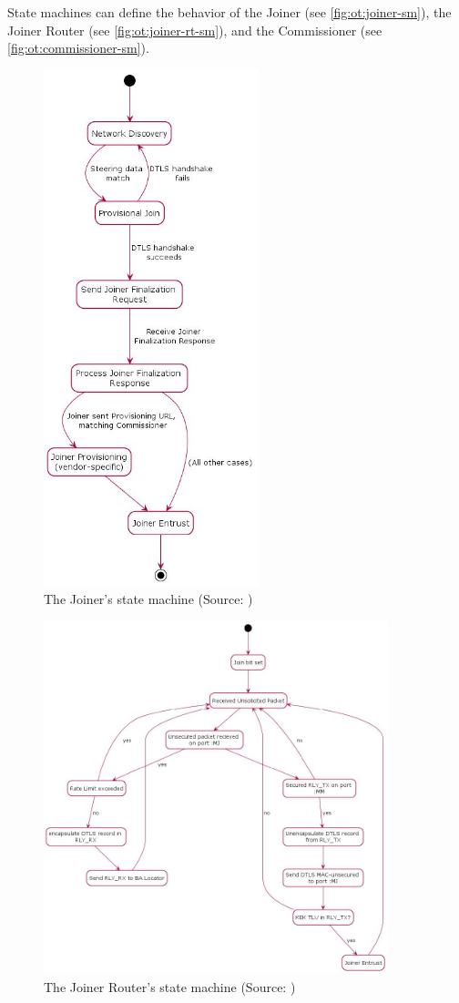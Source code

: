 State machines can define the behavior of the Joiner (see \autoref{fig:ot:joiner-sm}),
the Joiner Router (see \autoref{fig:ot:joiner-rt-sm}), and the Commissioner (see \autoref{fig:ot:commissioner-sm}).

\begin{figure}[!ht]
    \centering
    \includegraphics[height=150mm, keepaspectratio]{figures/joiner-sm-Final_12639Thread_1.3.jpg}
    \caption{The Joiner's state machine (Source: \cite{thread:130})}
    \label{fig:ot:joiner-sm}
\end{figure}

\begin{figure}[!ht]
    \centering
    \includegraphics[width=100mm, keepaspectratio]{figures/joiner-rt-smFinal_12639Thread_1.3.jpg}
    \caption{The Joiner Router's state machine (Source: \cite{thread:130})}
    \label{fig:ot:joiner-rt-sm}
\end{figure}

